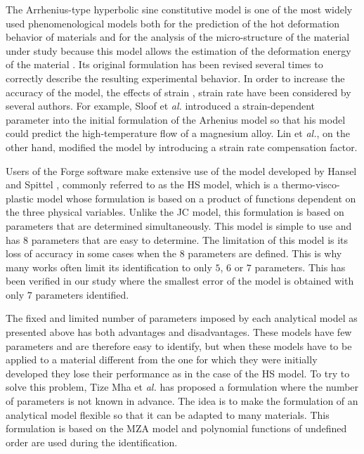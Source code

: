 \documentclass[twoside,english,1p,final,sort&compress]{elsarticle}
\makeatletter
\theoremstyle{plain}
\DeclareRobustCommand{\eal}{et \emph{al.}\@\xspace}
\makeatother
\begin{document}
The Arrhenius-type hyperbolic sine constitutive model is one of the most widely used phenomenological models both for the prediction of the hot deformation behavior of materials and for the analysis of the micro-structure of the material under study because this model allows the estimation of the deformation energy of the material \cite{Jonas-1969, Zhang-2012, Mostafaei-2012}.
Its original formulation has been revised several times to correctly describe the resulting experimental behavior.
In order to increase the accuracy of the model, the effects of strain \cite{Slooff-2007, Li-2012, Xu-2013}, strain rate \cite{Lin-2008-C, Mandal-2009} have been considered by several authors.
For example, Sloof \eal \cite{Slooff-2007} introduced a strain-dependent parameter into the initial formulation of the Arhenius model so that his model could predict the high-temperature flow of a magnesium alloy.
Lin \eal \cite{Lin-2008-C}, on the other hand, modified the model by introducing a strain rate compensation factor.

Users of the Forge software make extensive use of the model developed by Hansel and Spittel \cite{Hensel-1978}, commonly referred to as the HS model, which is a thermo-visco-plastic model whose formulation is based on a product of functions dependent on the three physical variables.
Unlike the JC model, this formulation is based on parameters that are determined simultaneously.
This model is simple to use and has $8$ parameters that are easy to determine.
The limitation of this model is its loss of accuracy in some cases when the $8$ parameters are defined.
This is why many works often limit its identification to only $5$, $6$ or $7$ parameters.
This has been verified in our study where the smallest error of the model is obtained with only $7$ parameters identified.

The fixed and limited number of parameters imposed by each analytical model as presented above has both advantages and disadvantages.
These models have few parameters and are therefore easy to identify, but when these models have to be applied to a material different from the one for which they were initially developed they lose their performance as in the case of the HS model.
To try to solve this problem, Tize Mha \eal \cite{TizeMha-2022} has proposed a formulation where the number of parameters is not known in advance.
The idea is to make the formulation of an analytical model flexible so that it can be adapted to many materials.
This formulation is based on the MZA model and polynomial functions of undefined order are used during the identification.
\end{document}
